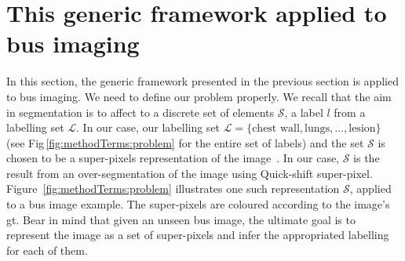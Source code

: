 \section{This generic framework applied to \ac{bus} imaging}\label{sec:method:dterm:feat}

In this section, the generic framework presented in the previous section is applied to \ac{bus} imaging. We need to define our problem properly. We recall that the aim in segmentation is to affect to a discrete set of elements $\mathcal{S}$, a label $l$ from a labelling set $\mathcal{L}$. In our case, our labelling set $\mathcal{L} = \{ \text{chest wall}, \text{lungs}, \dots, \text{lesion} \}$ (see Fig\,\ref{fig:methodTerms:problem} for the entire set of labels) and the set $\mathcal{S}$ is chosen to be a super-pixels representation of the image~\cite{achanta2012slic}. In our case, $\mathcal{S}$ is the result from an over-segmentation of the image using Quick-shift super-pixel. Figure~\ref{fig:methodTerms:problem} illustrates one such representation $\mathcal{S}$, applied to a \ac{bus} image example. The super-pixels are coloured according to the image's \ac{gt}. Bear in mind that given an unseen \ac{bus} image, the ultimate goal is to represent the image as a set of super-pixels and infer the appropriated labelling for each of them.

